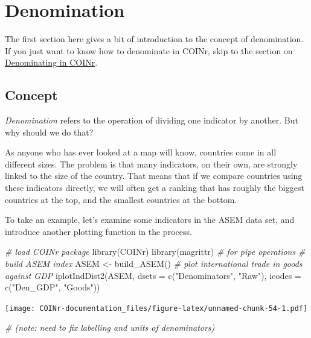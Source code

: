 \documentclass[
]{book}
\newenvironment{Shaded}{\begin{snugshade}}{\end{snugshade}}
\newcommand{\AttributeTok}[1]{\textcolor[rgb]{0.77,0.63,0.00}{#1}}
\newcommand{\CommentTok}[1]{\textcolor[rgb]{0.56,0.35,0.01}{\textit{#1}}}
\newcommand{\FunctionTok}[1]{\textcolor[rgb]{0.00,0.00,0.00}{#1}}
\newcommand{\NormalTok}[1]{#1}
\newcommand{\OtherTok}[1]{\textcolor[rgb]{0.56,0.35,0.01}{#1}}
\newcommand{\StringTok}[1]{\textcolor[rgb]{0.31,0.60,0.02}{#1}}
\begin{document}
\hypertarget{denomination}{%
\chapter{Denomination}\label{denomination}}

The first section here gives a bit of introduction to the concept of denomination. If you just want to know how to denominate in COINr, skip to the section on \protect\hyperlink{denominating-in-coinr}{Denominating in COINr}.

\hypertarget{concept-1}{%
\section{Concept}\label{concept-1}}

\emph{Denomination} refers to the operation of dividing one indicator by another. But why should we do that?

As anyone who has ever looked at a map will know, countries come in all different sizes. The problem is that many indicators, on their own, are strongly linked to the size of the country. That means that if we compare countries using these indicators directly, we will often get a ranking that has roughly the biggest countries at the top, and the smallest countries at the bottom.

To take an example, let's examine some indicators in the ASEM data set, and introduce another plotting function in the process.

\begin{Shaded}
\begin{Highlighting}[]
\CommentTok{\# load COINr package}
\FunctionTok{library}\NormalTok{(COINr)}
\FunctionTok{library}\NormalTok{(magrittr) }\CommentTok{\# for pipe operations}
\CommentTok{\# build ASEM index}
\NormalTok{ASEM }\OtherTok{\textless{}{-}} \FunctionTok{build\_ASEM}\NormalTok{()}
\CommentTok{\# plot international trade in goods against GDP}
\FunctionTok{iplotIndDist2}\NormalTok{(ASEM, }\AttributeTok{dsets =} \FunctionTok{c}\NormalTok{(}\StringTok{"Denominators"}\NormalTok{, }\StringTok{"Raw"}\NormalTok{), }\AttributeTok{icodes =} \FunctionTok{c}\NormalTok{(}\StringTok{"Den\_GDP"}\NormalTok{, }\StringTok{"Goods"}\NormalTok{))}
\end{Highlighting}
\end{Shaded}

\texttt{[image: COINr-documentation\_files/figure-latex/unnamed-chunk-54-1.pdf]}

\begin{Shaded}
\begin{Highlighting}[]
\CommentTok{\# (note: need to fix labelling and units of denominators)}
\end{Highlighting}
\end{Shaded}
\end{document}
